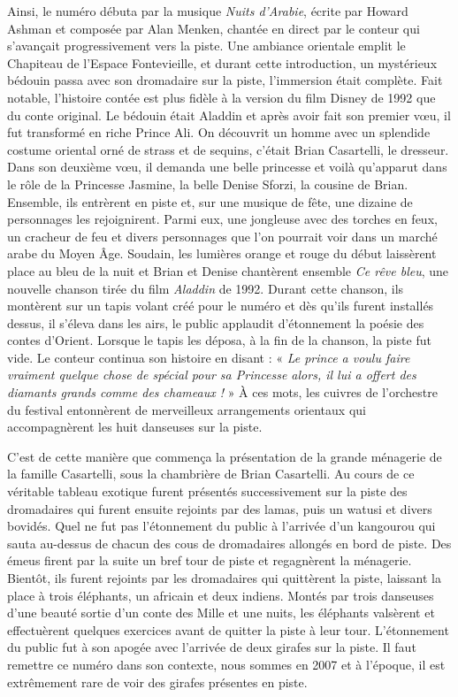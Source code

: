 Ainsi, le numéro débuta par la musique \textit{Nuits d’Arabie}, écrite par Howard Ashman et composée par Alan Menken, chantée en direct par le conteur qui s’avançait progressivement vers la piste. Une ambiance orientale emplit le Chapiteau de l’Espace Fontevieille, et durant cette introduction, un mystérieux bédouin passa avec son dromadaire sur la piste, l’immersion était complète. Fait notable, l’histoire contée est plus fidèle à la version du film Disney de 1992 que du conte original. Le bédouin était Aladdin et après avoir fait son premier vœu, il fut transformé en riche Prince Ali. On découvrit un homme avec un splendide costume oriental orné de strass et de sequins, c’était Brian Casartelli, le dresseur. Dans son deuxième vœu, il demanda une belle princesse et voilà qu’apparut dans le rôle de la Princesse Jasmine, la belle Denise Sforzi, la cousine de Brian. Ensemble, ils entrèrent en piste et, sur une musique de fête, une dizaine de personnages les rejoignirent. Parmi eux, une jongleuse avec des torches en feux, un cracheur de feu et divers personnages que l’on pourrait voir dans un marché arabe du Moyen Âge. Soudain, les lumières orange et rouge du début laissèrent place au bleu de la nuit et Brian et Denise chantèrent ensemble \textit{Ce rêve bleu}, une nouvelle chanson tirée du film \textit{Aladdin} de 1992. Durant cette chanson, ils montèrent sur un tapis volant créé pour le numéro et dès qu’ils furent installés dessus, il s’éleva dans les airs, le public applaudit d’étonnement la poésie des contes d’Orient. Lorsque le tapis les déposa, à la fin de la chanson, la piste fut vide. Le conteur continua son histoire en disant : « \textit{Le prince a voulu faire vraiment quelque chose de spécial pour sa Princesse alors, il lui a offert des diamants grands comme des chameaux !} » À ces mots, les cuivres de l’orchestre du festival entonnèrent de merveilleux arrangements orientaux qui accompagnèrent les huit danseuses sur la piste. 

C’est de cette manière que commença la présentation de la grande ménagerie de la famille Casartelli, sous la chambrière de Brian Casartelli. Au cours de ce véritable tableau exotique furent présentés successivement sur la piste des dromadaires qui furent ensuite rejoints par des lamas, puis un watusi et divers bovidés. Quel ne fut pas l’étonnement du public à l’arrivée d’un kangourou qui sauta au-dessus de chacun des cous de dromadaires allongés en bord de piste. Des émeus firent par la suite un bref tour de piste et regagnèrent la ménagerie. Bientôt, ils furent rejoints par les dromadaires qui quittèrent la piste, laissant la place à trois éléphants, un africain et deux indiens. Montés par trois danseuses d’une beauté sortie d’un conte des Mille et une nuits, les éléphants valsèrent et effectuèrent quelques exercices avant de quitter la piste à leur tour. L’étonnement du public fut à son apogée avec l’arrivée de deux girafes sur la piste. Il faut remettre ce numéro dans son contexte, nous sommes en 2007 et à l’époque, il est extrêmement rare de voir des girafes présentes en piste.

